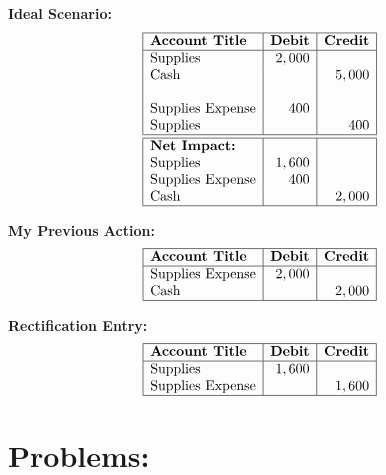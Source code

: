 \documentclass[12pt,a4paper]{book}
\begin{document}
\textbf{Ideal Scenario:}
\[
\begin{array}{|l|r|r|}
\hline
\textbf{Account Title} & \textbf{Debit} & \textbf{Credit} \\
\hline
\text{Supplies} & 2,000 & \\
\text{Cash} & & 5,000 \\
& & \\
\text{Supplies Expense} & 400 & \\
\text{Supplies} & & 400 \\
\hline \hline 
\textbf{Net Impact:} & & \\
\text{Supplies} & 1,600 & \\
\text{Supplies Expense} & 400 & \\
\text{Cash} & & 2,000 \\
\hline 
\end{array}
\]

\begin{multicols}{2}
\textbf{My Previous Action:}
\[
\begin{array}{|l|r|r|}
\hline
\textbf{Account Title} & \textbf{Debit} & \textbf{Credit} \\
\hline
\text{Supplies Expense} & 2,000 & \\
\text{Cash} & & 2,000 \\
\hline
\end{array}
\]

\textbf{Rectification Entry:}
\[
\begin{array}{|l|r|r|}
\hline
\textbf{Account Title} & \textbf{Debit} & \textbf{Credit} \\
\hline
\text{Supplies} & 1,600 & \\
\text{Supplies Expense} & & 1,600 \\
\hline
\end{array}
\]

\end{multicols}
\vspace{0.5cm}

\section*{Problems:} 
\end{document}
